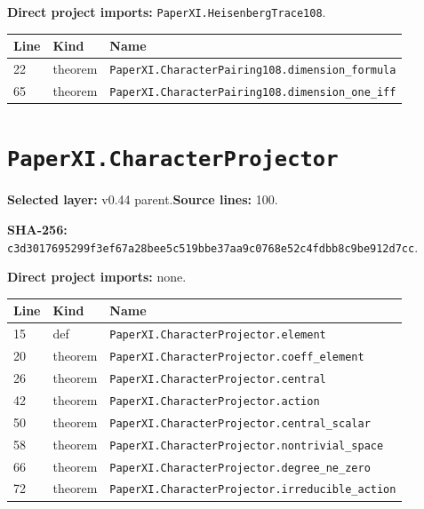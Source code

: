 \documentclass[10pt,oneside]{book}
\begin{document}
\textbf{Direct project imports:} \nolinkurl{PaperXI.HeisenbergTrace108}.

\begin{longtable}{@{}p{}p{}p{}@{}}\toprule Line&Kind&Name\\\midrule\endhead

22&theorem&\nolinkurl{PaperXI.CharacterPairing108.dimension_formula}\\

65&theorem&\nolinkurl{PaperXI.CharacterPairing108.dimension_one_iff}\\

\bottomrule\end{longtable}

\section{\texorpdfstring{\nolinkurl{PaperXI.CharacterProjector}}{PaperXI.CharacterProjector}}\label{module:PaperXI.CharacterProjector}

\textbf{Selected layer:} v0.44 parent.\quad\textbf{Source lines:} 100.\par\textbf{SHA-256:} {\scriptsize\nolinkurl{c3d3017695299f3ef67a28bee5c519bbe37aa9c0768e52c4fdbb8c9be912d7cc}}.


\textbf{Direct project imports:} none.

\begin{longtable}{@{}p{}p{}p{}@{}}\toprule Line&Kind&Name\\\midrule\endhead

15&def&\nolinkurl{PaperXI.CharacterProjector.element}\\

20&theorem&\nolinkurl{PaperXI.CharacterProjector.coeff_element}\\

26&theorem&\nolinkurl{PaperXI.CharacterProjector.central}\\

42&theorem&\nolinkurl{PaperXI.CharacterProjector.action}\\

50&theorem&\nolinkurl{PaperXI.CharacterProjector.central_scalar}\\

58&theorem&\nolinkurl{PaperXI.CharacterProjector.nontrivial_space}\\

66&theorem&\nolinkurl{PaperXI.CharacterProjector.degree_ne_zero}\\

72&theorem&\nolinkurl{PaperXI.CharacterProjector.irreducible_action}\\

\bottomrule\end{longtable}
\end{document}
